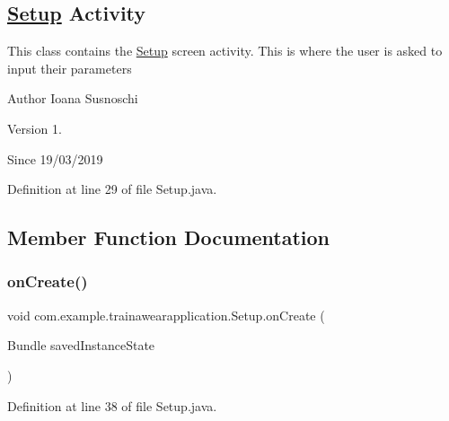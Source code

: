 \subsection*{\mbox{\hyperlink{classcom_1_1example_1_1trainawearapplication_1_1_setup}{Setup}} Activity}

This class contains the \mbox{\hyperlink{classcom_1_1example_1_1trainawearapplication_1_1_setup}{Setup}} screen activity. This is where the user is asked to input their parameters

\begin{DoxyAuthor}{Author}
Ioana Susnoschi 
\end{DoxyAuthor}
\begin{DoxyVersion}{Version}
1. 
\end{DoxyVersion}
\begin{DoxySince}{Since}
19/03/2019 
\end{DoxySince}


Definition at line 29 of file Setup.\+java.



\subsection{Member Function Documentation}
\mbox{\label{classcom_1_1example_1_1trainawearapplication_1_1_setup_a52f522c34d14c93dbf7f75ff75ce606d}} 
\subsubsection{\texorpdfstring{onCreate()}{onCreate()}}
{\footnotesize\ttfamily void com.\+example.\+trainawearapplication.\+Setup.\+on\+Create (\begin{DoxyParamCaption}\item[{Bundle}]{saved\+Instance\+State }\end{DoxyParamCaption})\hspace{0.3cm}{\ttfamily [protected]}}



Definition at line 38 of file Setup.\+java.


